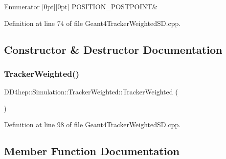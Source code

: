 \begin{DoxyEnumFields}{Enumerator}
[0pt][0pt]{}\hypertarget{struct_d_d4hep_1_1_simulation_1_1_tracker_weighted_a8cdc474134c1f8b3a8344e32fc3d4421ac0ca75f525d337568debb34bf3545e29}{}\label{struct_d_d4hep_1_1_simulation_1_1_tracker_weighted_a8cdc474134c1f8b3a8344e32fc3d4421ac0ca75f525d337568debb34bf3545e29} 
P\+O\+S\+I\+T\+I\+O\+N\+\_\+\+P\+O\+S\+T\+P\+O\+I\+NT&\\
\hline

\end{DoxyEnumFields}


Definition at line 74 of file Geant4\+Tracker\+Weighted\+S\+D.\+cpp.



\subsection{Constructor \& Destructor Documentation}
\hypertarget{struct_d_d4hep_1_1_simulation_1_1_tracker_weighted_ae628c5cfae79d839a0640338ba31a6ad}{}\label{struct_d_d4hep_1_1_simulation_1_1_tracker_weighted_ae628c5cfae79d839a0640338ba31a6ad} 
\subsubsection{\texorpdfstring{Tracker\+Weighted()}{TrackerWeighted()}}
{\footnotesize\ttfamily D\+D4hep\+::\+Simulation\+::\+Tracker\+Weighted\+::\+Tracker\+Weighted (\begin{DoxyParamCaption}{ }\end{DoxyParamCaption})\hspace{0.3cm}{\ttfamily [inline]}}



Definition at line 98 of file Geant4\+Tracker\+Weighted\+S\+D.\+cpp.



\subsection{Member Function Documentation}
\hypertarget{struct_d_d4hep_1_1_simulation_1_1_tracker_weighted_aa9139da9ecb7c109b7108cc27a27c13d}{}\label{struct_d_d4hep_1_1_simulation_1_1_tracker_weighted_aa9139da9ecb7c109b7108cc27a27c13d} 

